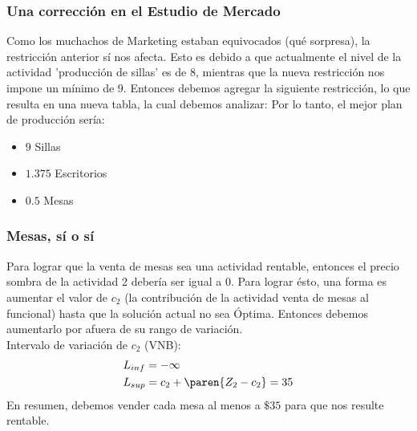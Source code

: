 \begin{homeworkProblem}[1][Dakota]
\subsubsection{Una corrección en el Estudio de Mercado}
Como los muchachos de Marketing estaban equivocados (qué sorpresa), la restricción anterior sí nos afecta. Esto es debido a que actualmente el nivel de la actividad 'producción de sillas' es de 8, mientras que la nueva restricción nos impone un mínimo de 9.
Entonces debemos agregar la siguiente restricción,
lo que resulta en una nueva tabla, la cual debemos analizar:
\pagebreak
Por lo tanto, el mejor plan de producción sería:
\begin{itemize}
	\item $9$ Sillas
	\item $1.375$ Escritorios
	\item $0.5$ Mesas
\end{itemize}


\subsubsection{Mesas, sí o sí}
Para lograr que la venta de mesas sea una actividad rentable, entonces el precio sombra de la actividad 2 debería ser igual a $0$. Para lograr ésto, una forma es aumentar el valor de $c_2$ (la contribución de la actividad venta de mesas al funcional) hasta que la solución actual no sea Óptima. Entonces debemos aumentarlo por afuera de su rango de variación. \\
Intervalo de variación de $c_2$ (VNB):
\begin{align*}
  &L_{inf} = -\infty \\
  &L_{sup} = c_2 + \paren{Z_2 - c_2} = 35  
\end{align*}
En resumen, debemos vender cada mesa al menos a $\$35$ para que nos resulte rentable.
\end{homeworkProblem}